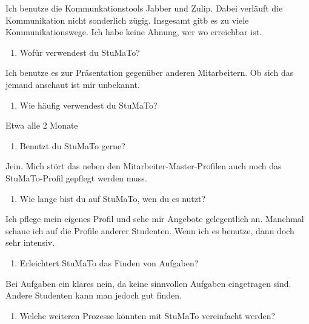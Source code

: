 \documentclass[
  12pt,
  ngerman,
  a4paper,
]{article}
\providecommand{\tightlist}{%
  \setlength{\itemsep}{0pt}\setlength{\parskip}{0pt}}
\begin{document}
Ich benutze die Kommunkationstools Jabber und Zulip. Dabei verläuft die
Kommunikation nicht sonderlich zügig. Insgesamt gitb es zu viele
Kommunikationswege. Ich habe keine Ahnung, wer wo erreichbar ist.

\begin{enumerate}
\def\labelenumi{\arabic{enumi}.}
\setcounter{enumi}{9}
\tightlist
\item
  Wofür verwendest du StuMaTo?
\end{enumerate}

Ich benutze es zur Präsentation gegenüber anderen Mitarbeitern. Ob sich
das jemand anschaut ist mir unbekannt.

\begin{enumerate}
\def\labelenumi{\arabic{enumi}.}
\setcounter{enumi}{10}
\tightlist
\item
  Wie häufig verwendest du StuMaTo?
\end{enumerate}

Etwa alle 2 Monate

\begin{enumerate}
\def\labelenumi{\arabic{enumi}.}
\setcounter{enumi}{11}
\tightlist
\item
  Benutzt du StuMaTo gerne?
\end{enumerate}

Jein. Mich stört das neben den Mitarbeiter-Master-Profilen auch noch das
StuMaTo-Profil gepflegt werden muss.

\begin{enumerate}
\def\labelenumi{\arabic{enumi}.}
\setcounter{enumi}{12}
\tightlist
\item
  Wie lange bist du auf StuMaTo, wen du es nutzt?
\end{enumerate}

Ich pflege mein eigenes Profil und sehe mir Angebote gelegentlich an.
Manchmal schaue ich auf die Profile anderer Studenten. Wenn ich es
benutze, dann doch sehr intensiv.

\begin{enumerate}
\def\labelenumi{\arabic{enumi}.}
\setcounter{enumi}{13}
\tightlist
\item
  Erleichtert StuMaTo das Finden von Aufgaben?
\end{enumerate}

Bei Aufgaben ein klares nein, da keine sinnvollen Aufgaben eingetragen
sind. Andere Studenten kann man jedoch gut finden.

\begin{enumerate}
\def\labelenumi{\arabic{enumi}.}
\setcounter{enumi}{14}
\tightlist
\item
  Welche weiteren Prozesse könnten mit StuMaTo vereinfacht werden?
\end{enumerate}
\end{document}
